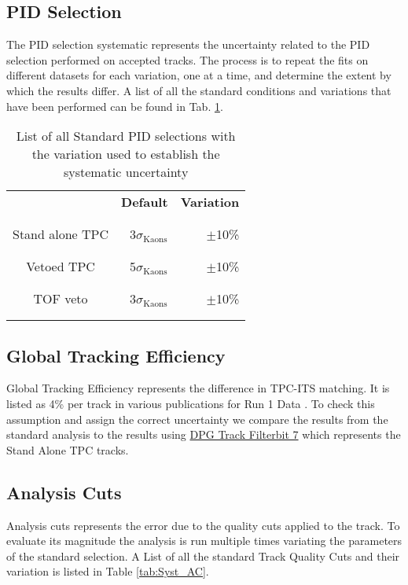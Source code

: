 \subsection{PID Selection}
The PID selection systematic represents the uncertainty related to the PID selection performed on accepted tracks. The process is to repeat the fits on different datasets for each variation, one at a time, and determine the extent by which the results differ. A list of all the standard conditions and variations that have been performed can be found in Tab. \ref{tab:Syst_PID}.
\begin{table}[h]
\center
\begin{tabular}{c|r|r}
					&\textbf{Default}							&\textbf{Variation}		\\
					\\ \hline \\
Stand alone TPC		&3$\sigma_{\text{Kaons}}$					& $\pm$10\%\\
					\\ \hline \\
Vetoed TPC			&5$\sigma_{\text{Kaons}}$					& $\pm$10\%\\
					\\ \hline \\
TOF veto				&3$\sigma_{\text{Kaons}}$					& $\pm$10\%\\
					\\ \hline \\

\end{tabular}
\caption{List of all Standard PID selections with the variation used to establish the systematic uncertainty}
\label{tab:Syst_PID}
\end{table}

\subsection{Global Tracking Efficiency}
Global Tracking Efficiency represents the difference in TPC-ITS matching. It is listed as 4\% per track in various publications for Run 1 Data \cite{PrevPubMult}. To check this assumption and assign the correct uncertainty we compare the results from the standard analysis to the results using \href{https://twiki.cern.ch/twiki/bin/viewauth/ALICE/AliDPGtoolsFilteringCuts#Run_flag_1000_AddTrackCutsLHC10b}{DPG Track Filterbit 7} which represents the Stand Alone TPC tracks.

\subsection{Analysis Cuts}
Analysis cuts represents the error due to the quality cuts applied to the track. To evaluate its magnitude the analysis is run multiple times variating the parameters of the standard selection. A List of all the standard Track Quality Cuts and their variation is listed in Table \ref{tab:Syst_AC}.

